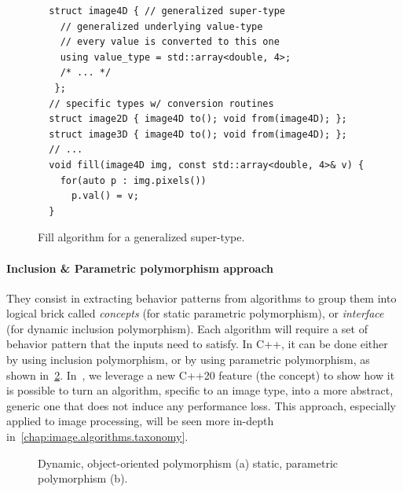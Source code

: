 \begin{figure}[htbp]
  \centering
  \begin{verbatim}
  struct image4D { // generalized super-type
    // generalized underlying value-type
    // every value is converted to this one
    using value_type = std::array<double, 4>;
    /* ... */
   };
  // specific types w/ conversion routines
  struct image2D { image4D to(); void from(image4D); };
  struct image3D { image4D to(); void from(image4D); };
  // ...
  void fill(image4D img, const std::array<double, 4>& v) {
    for(auto p : img.pixels())
      p.val() = v;
  }
  \end{verbatim}
  \caption{Fill algorithm for a generalized super-type.}
  \label{code:gen.generalized}
\end{figure}

\paragraph{Inclusion \& Parametric polymorphism approach} They consist in extracting behavior patterns from algorithms
to group them into logical brick called \emph{concepts} (for static parametric polymorphism), or \emph{interface} (for
dynamic inclusion polymorphism). Each algorithm will require a set of behavior pattern that the inputs need to satisfy.
In C++, it can be done either by using inclusion polymorphism, or by using parametric polymorphism, as shown
in~\ref{code:gen.inclupoly}. In~\parencite{roynard.2019.rrpr}, we leverage a new C++20 feature (the concept) to show how
it is possible to turn an algorithm, specific to an image type, into a more abstract, generic one that does not induce
any performance loss. This approach, especially applied to image processing, will be seen more in-depth
in~\cref{chap:image.algorithms.taxonomy}.

\begin{figure}[htb]
  \centering
  \hfil
  \vfil
  \hfil
  \caption{Dynamic, object-oriented polymorphism (a) \vs static, parametric polymorphism (b).}
  \label{code:gen.inclupoly}
\end{figure}


